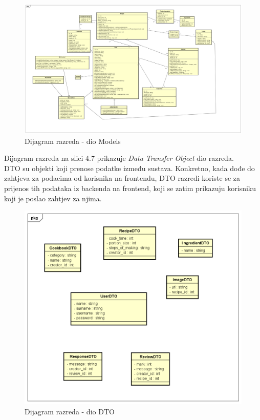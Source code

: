 			
			\begin{figure}[H]
			\includegraphics[scale=0.2]{dijagrami/UML_dijagram_razreda_models.png} %
			\centering
			\caption{Dijagram razreda - dio Models}
			\label{Dijagram razreda - dio Models}
		\end{figure}
		
Dijagram razreda na slici 4.7 prikazuje \textit{Data Transfer Object} dio razreda. \\
DTO su objekti koji prenose podatke između sustava. Konkretno, kada dođe do zahtjeva za podacima od korisnika na frontendu, DTO razredi koriste se za prijenos tih podataka iz backenda na frontend, koji se zatim prikazuju korisniku koji je poslao zahtjev za njima.

			\begin{figure}[H]
			\includegraphics[scale=0.2]{dijagrami/UML_dijagram_razreda_dtos.png} %
			\centering
			\caption{Dijagram razreda - dio DTO}
			\label{Dijagram razreda - dio DTO}
		\end{figure}


